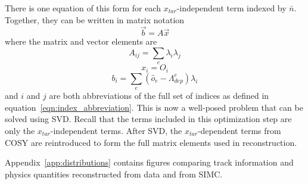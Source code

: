 There is one equation of this form for each $x_{tar}$-independent term indexed
by $\bar{n}$.
Together, they can be written in matrix notation
\begin{equation}
    \vec{b} = A \vec{x}
\end{equation}
where the matrix and vector elements are
\begin{equation}
    A_{ij} = \sum_e \lambda_i \lambda_j
\end{equation}
\begin{equation}
    x_i = O_i
\end{equation}
\begin{equation}
    b_i = \sum_e(\hat{o}_e - \Lambda^e_{dep}) \lambda_i
\end{equation}
and $i$ and $j$ are both abbreviations of the full set of indices as defined in
equation~\ref{eqn:index_abbreviation}.
This is now a well-posed problem that can be solved using SVD.
Recall that the terms included in this optimization step are only the
$x_{tar}$-independent terms.
After SVD, the $x_{tar}$-dependent terms from COSY are reintroduced to form the
full matrix elements used in reconstruction.

Appendix~\ref{app:distributions} contains figures comparing track information
and physics quantities reconstructed from data and from SIMC.
